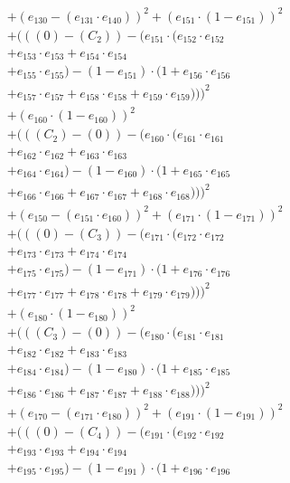 \documentclass[10pt, a4paper]{article}
\begin{document}
\begin{align*}
& + (e_{130} - (e_{131} \cdot e_{140}))^{2} + (e_{151} \cdot (1 - e_{151}))^{2} \\
& + (((0) - (C_{2})) - (e_{151} \cdot (e_{152} \cdot e_{152} \\
& + e_{153} \cdot e_{153} + e_{154} \cdot e_{154} \\
& + e_{155} \cdot e_{155}) - (1 - e_{151}) \cdot (1 + e_{156} \cdot e_{156} \\
& + e_{157} \cdot e_{157} + e_{158} \cdot e_{158} + e_{159} \cdot e_{159})))^{2} \\
& + (e_{160} \cdot (1 - e_{160}))^{2} \\
& + (((C_{2}) - (0)) - (e_{160} \cdot (e_{161} \cdot e_{161} \\
& + e_{162} \cdot e_{162} + e_{163} \cdot e_{163} \\
& + e_{164} \cdot e_{164}) - (1 - e_{160}) \cdot (1 + e_{165} \cdot e_{165} \\
& + e_{166} \cdot e_{166} + e_{167} \cdot e_{167} + e_{168} \cdot e_{168})))^{2} \\
& + (e_{150} - (e_{151} \cdot e_{160}))^{2} + (e_{171} \cdot (1 - e_{171}))^{2} \\
& + (((0) - (C_{3})) - (e_{171} \cdot (e_{172} \cdot e_{172} \\
& + e_{173} \cdot e_{173} + e_{174} \cdot e_{174} \\
& + e_{175} \cdot e_{175}) - (1 - e_{171}) \cdot (1 + e_{176} \cdot e_{176} \\
& + e_{177} \cdot e_{177} + e_{178} \cdot e_{178} + e_{179} \cdot e_{179})))^{2} \\
& + (e_{180} \cdot (1 - e_{180}))^{2} \\
& + (((C_{3}) - (0)) - (e_{180} \cdot (e_{181} \cdot e_{181} \\
& + e_{182} \cdot e_{182} + e_{183} \cdot e_{183} \\
& + e_{184} \cdot e_{184}) - (1 - e_{180}) \cdot (1 + e_{185} \cdot e_{185} \\
& + e_{186} \cdot e_{186} + e_{187} \cdot e_{187} + e_{188} \cdot e_{188})))^{2} \\
& + (e_{170} - (e_{171} \cdot e_{180}))^{2} + (e_{191} \cdot (1 - e_{191}))^{2} \\
& + (((0) - (C_{4})) - (e_{191} \cdot (e_{192} \cdot e_{192} \\
& + e_{193} \cdot e_{193} + e_{194} \cdot e_{194} \\
& + e_{195} \cdot e_{195}) - (1 - e_{191}) \cdot (1 + e_{196} \cdot e_{196} \\

\end{align*}
\end{document}
